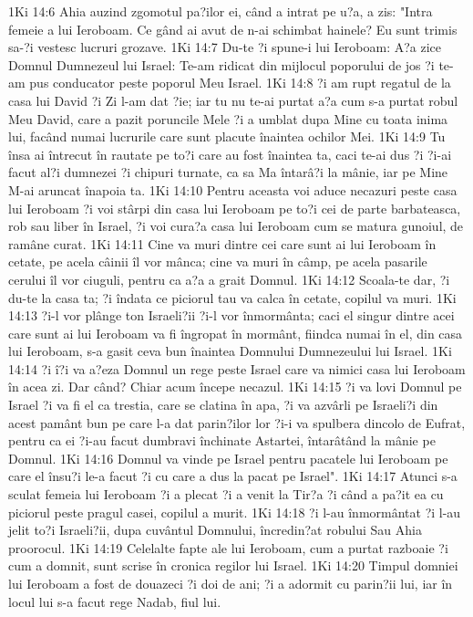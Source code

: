 1Ki 14:6  Ahia auzind zgomotul pa?ilor ei, când a intrat pe u?a, a zis: "Intra femeie a lui Ieroboam. Ce gând ai avut de n-ai schimbat hainele? Eu sunt trimis sa-?i vestesc lucruri grozave.
1Ki 14:7  Du-te ?i spune-i lui Ieroboam: A?a zice Domnul Dumnezeul lui Israel: Te-am ridicat din mijlocul poporului de jos ?i te-am pus conducator peste poporul Meu Israel.
1Ki 14:8  ?i am rupt regatul de la casa lui David ?i Zi l-am dat ?ie; iar tu nu te-ai purtat a?a cum s-a purtat robul Meu David, care a pazit poruncile Mele ?i a umblat dupa Mine cu toata inima lui, facând numai lucrurile care sunt placute înaintea ochilor Mei.
1Ki 14:9  Tu însa ai întrecut în rautate pe to?i care au fost înaintea ta, caci te-ai dus ?i ?i-ai facut al?i dumnezei ?i chipuri turnate, ca sa Ma întarâ?i la mânie, iar pe Mine M-ai aruncat înapoia ta.
1Ki 14:10  Pentru aceasta voi aduce necazuri peste casa lui Ieroboam ?i voi stârpi din casa lui Ieroboam pe to?i cei de parte barbateasca, rob sau liber în Israel, ?i voi cura?a casa lui Ieroboam cum se matura gunoiul, de ramâne curat.
1Ki 14:11  Cine va muri dintre cei care sunt ai lui Ieroboam în cetate, pe acela câinii îl vor mânca; cine va muri în câmp, pe acela pasarile cerului îl vor ciuguli, pentru ca a?a a grait Domnul.
1Ki 14:12  Scoala-te dar, ?i du-te la casa ta; ?i îndata ce piciorul tau va calca în cetate, copilul va muri.
1Ki 14:13  ?i-l vor plânge ton Israeli?ii ?i-l vor înmormânta; caci el singur dintre acei care sunt ai lui Ieroboam va fi îngropat în mormânt, fiindca numai în el, din casa lui Ieroboam, s-a gasit ceva bun înaintea Domnului Dumnezeului lui Israel.
1Ki 14:14  ?i î?i va a?eza Domnul un rege peste Israel care va nimici casa lui Ieroboam în acea zi. Dar când? Chiar acum începe necazul.
1Ki 14:15  ?i va lovi Domnul pe Israel ?i va fi el ca trestia, care se clatina în apa, ?i va azvârli pe Israeli?i din acest pamânt bun pe care l-a dat parin?ilor lor ?i-i va spulbera dincolo de Eufrat, pentru ca ei ?i-au facut dumbravi închinate Astartei, întarâtând la mânie pe Domnul.
1Ki 14:16  Domnul va vinde pe Israel pentru pacatele lui Ieroboam pe care el însu?i le-a facut ?i cu care a dus la pacat pe Israel".
1Ki 14:17  Atunci s-a sculat femeia lui Ieroboam ?i a plecat ?i a venit la Tir?a ?i când a pa?it ea cu piciorul peste pragul casei, copilul a murit.
1Ki 14:18  ?i l-au înmormântat ?i l-au jelit to?i Israeli?ii, dupa cuvântul Domnului, încredin?at robului Sau Ahia proorocul.
1Ki 14:19  Celelalte fapte ale lui Ieroboam, cum a purtat razboaie ?i cum a domnit, sunt scrise în cronica regilor lui Israel.
1Ki 14:20  Timpul domniei lui Ieroboam a fost de douazeci ?i doi de ani; ?i a adormit cu parin?ii lui, iar în locul lui s-a facut rege Nadab, fiul lui.
